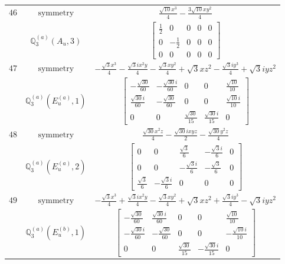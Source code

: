 \documentclass[fleqn,8pt,landscape]{jsarticle}
\begin{document}
\begin{longtable}{ccc}
$ 46 $ & $ \text{symmetry} $ & $ \frac{\sqrt{10} x^{3}}{4} - \frac{3 \sqrt{10} x y^{2}}{4} $ \\
$  $ & $ \mathbb{Q}_{3}^{(a)}(A_{u},3) $ & $ \begin{bmatrix} \frac{1}{2} & 0 & 0 & 0 & 0 \\ 0 & - \frac{1}{2} & 0 & 0 & 0 \\ 0 & 0 & 0 & 0 & 0 \end{bmatrix} $ \\ \hline
$ 47 $ & $ \text{symmetry} $ & $ - \frac{\sqrt{3} x^{3}}{4} - \frac{\sqrt{3} i x^{2} y}{4} - \frac{\sqrt{3} x y^{2}}{4} + \sqrt{3} x z^{2} - \frac{\sqrt{3} i y^{3}}{4} + \sqrt{3} i y z^{2} $ \\
$  $ & $ \mathbb{Q}_{3}^{(a)}(E_{u}^{(a)},1) $ & $ \begin{bmatrix} - \frac{\sqrt{30}}{60} & - \frac{\sqrt{30} i}{60} & 0 & 0 & \frac{\sqrt{10}}{10} \\ \frac{\sqrt{30} i}{60} & - \frac{\sqrt{30}}{60} & 0 & 0 & \frac{\sqrt{10} i}{10} \\ 0 & 0 & \frac{\sqrt{30}}{15} & \frac{\sqrt{30} i}{15} & 0 \end{bmatrix} $ \\ \hline
$ 48 $ & $ \text{symmetry} $ & $ \frac{\sqrt{30} x^{2} z}{4} - \frac{\sqrt{30} i x y z}{2} - \frac{\sqrt{30} y^{2} z}{4} $ \\
$  $ & $ \mathbb{Q}_{3}^{(a)}(E_{u}^{(a)},2) $ & $ \begin{bmatrix} 0 & 0 & \frac{\sqrt{3}}{6} & - \frac{\sqrt{3} i}{6} & 0 \\ 0 & 0 & - \frac{\sqrt{3} i}{6} & - \frac{\sqrt{3}}{6} & 0 \\ \frac{\sqrt{3}}{6} & - \frac{\sqrt{3} i}{6} & 0 & 0 & 0 \end{bmatrix} $ \\ \hline
$ 49 $ & $ \text{symmetry} $ & $ - \frac{\sqrt{3} x^{3}}{4} + \frac{\sqrt{3} i x^{2} y}{4} - \frac{\sqrt{3} x y^{2}}{4} + \sqrt{3} x z^{2} + \frac{\sqrt{3} i y^{3}}{4} - \sqrt{3} i y z^{2} $ \\
$  $ & $ \mathbb{Q}_{3}^{(a)}(E_{u}^{(b)},1) $ & $ \begin{bmatrix} - \frac{\sqrt{30}}{60} & \frac{\sqrt{30} i}{60} & 0 & 0 & \frac{\sqrt{10}}{10} \\ - \frac{\sqrt{30} i}{60} & - \frac{\sqrt{30}}{60} & 0 & 0 & - \frac{\sqrt{10} i}{10} \\ 0 & 0 & \frac{\sqrt{30}}{15} & - \frac{\sqrt{30} i}{15} & 0 \end{bmatrix} $ \\ \hline

\end{longtable}
\end{document}
